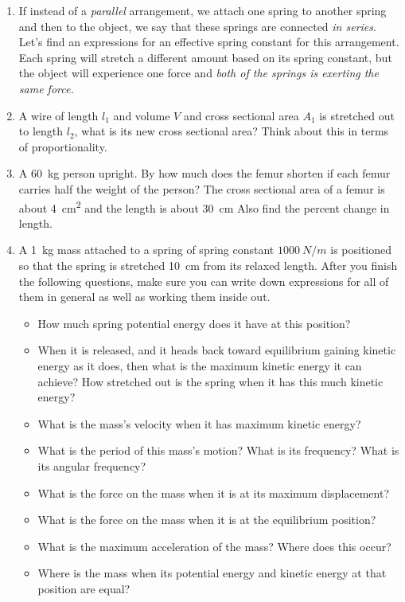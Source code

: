 \begin{enumerate}
\item
If instead of a \emph{parallel} arrangement, we attach one spring to another spring and then to the object, we say that these springs are connected \emph{in series}. Let's find an expressions for an effective spring constant for this arrangement. Each spring will stretch a different amount based on its spring constant, but the object will experience one force and \emph{both of the springs is exerting the same force.} \giantskip

\item
A wire of length $l_1$ and volume $V$ and cross sectional area $A_1$ is stretched out to length $l_2$, what is its new cross sectional area? Think about this in terms of proportionality.

\item
A \SI{60}{kg} person upright. By how much does the femur shorten if each femur carries half the weight of the person? The cross sectional area of a femur is about \SI{4}{cm^2} and the length is about \SI{30}{cm} Also find the percent change in length. 

\item
A \SI{1}{kg} mass attached to a spring of spring constant $\SI{1000}{N/m}$ is positioned so that the spring is stretched \SI{10}{cm} from its relaxed length. After you finish the following questions, make sure you can write down expressions for all of them in general as well as working them inside out.
\begin{itemize}
	\setlength\itemsep{1 in}
	\item How much spring potential energy does it have at this position?
	\item When it is released, and it heads back toward equilibrium gaining kinetic energy as it does, then what is the maximum kinetic energy it can achieve? How stretched out is the spring when it has this much kinetic energy? 
	\item What is the mass's velocity when it has maximum kinetic energy?
	\item What is the period of this mass's motion? What is its frequency? What is its angular frequency?
	\item What is the force on the mass when it is at its maximum displacement?
	\item What is the force on the mass when it is at the equilibrium position?
	\item What is the maximum acceleration of the mass? Where does this occur?
	\item Where is the mass when its potential energy and kinetic energy at that position are equal?
\end{itemize}


\end{enumerate}
